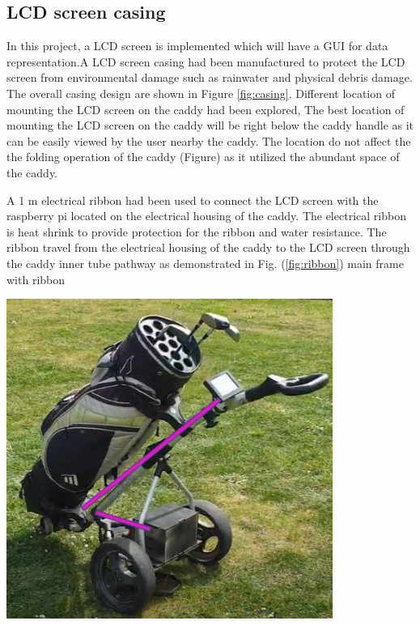 \documentclass[11pt,landscape]{article}
\newenvironment{Figure}
  {\par\medskip\noindent\minipage{\linewidth}}
  {\endminipage\par\medskip}
\begin{document}
\begin{multicols}{3}
    \subsection{LCD screen casing}
    In this project, a LCD screen is implemented which will have a GUI for data
    representation.A LCD screen casing had been manufactured to protect the LCD
    screen from environmental damage such as rainwater and physical debris
    damage. The overall casing design are shown in Figure \ref{fig:casing}.
    Different location of mounting the LCD screen on the caddy had been
    explored, The best location of mounting the LCD screen on the caddy will be
    right below the caddy handle as it can be easily viewed by the user nearby
    the caddy. The location do not affect the the folding operation of the caddy
    (Figure) as it utilized the abundant space of the caddy. 
    
    A 1 m electrical ribbon had been used to connect the LCD screen with the
    raspberry pi located on the electrical housing of the caddy. The electrical
    ribbon is heat shrink to provide protection for the ribbon and water
    resistance. The ribbon travel from the electrical housing of the caddy to
    the LCD screen through the caddy inner tube pathway as demonstrated in
     Fig. (\ref{fig:ribbon}) main frame with ribbon

    \begin{Figure}
        \begin{center}
            \includegraphics[width=0.8\textwidth]{Figure33.jpg}
            \label{fig:ribbon}
        \end{center}
    \end{Figure}
    

\end{multicols}
\end{document}
